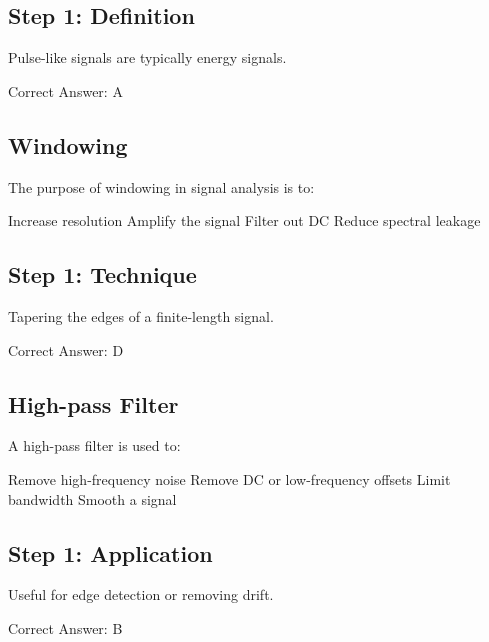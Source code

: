 \begin{solution}

\subsection*{Step 1: Definition}
Pulse-like signals are typically energy signals.

Correct Answer: A
\end{solution}

\clearpage

\subsection{Windowing}

The purpose of windowing in signal analysis is to:

\begin{choices}
    \choice Increase resolution
    \choice Amplify the signal
    \choice Filter out DC
    \correctchoice Reduce spectral leakage
\end{choices}

\begin{solution}

\subsection*{Step 1: Technique}
Tapering the edges of a finite-length signal.

Correct Answer: D
\end{solution}

\clearpage

\subsection{High-pass Filter}

A high-pass filter is used to:

\begin{choices}
    \choice Remove high-frequency noise
    \correctchoice Remove DC or low-frequency offsets
    \choice Limit bandwidth
    \choice Smooth a signal
\end{choices}

\begin{solution}

\subsection*{Step 1: Application}
Useful for edge detection or removing drift.

Correct Answer: B
\end{solution}

